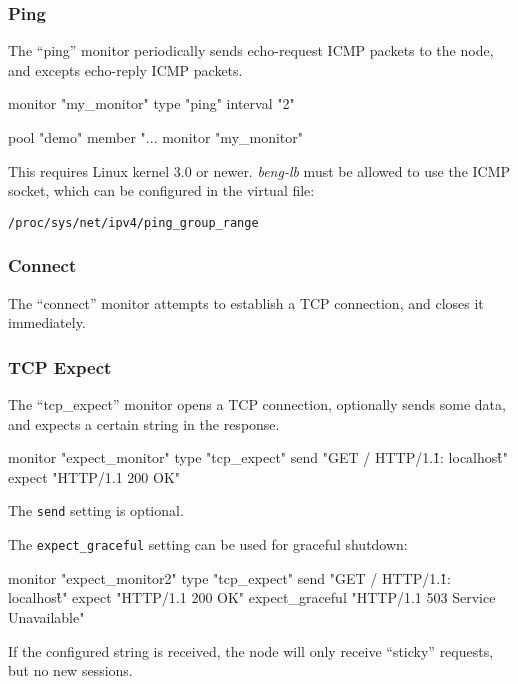 \documentclass[a4paper,12pt]{article}
\begin{document}
\subsubsection{Ping}

The ``ping'' monitor periodically sends echo-request ICMP packets to
the node, and excepts echo-reply ICMP packets.

\begin{verbatim*}
monitor "my_monitor" {
  type "ping"
  interval "2"
}

pool "demo" {
  member "...
  monitor "my_monitor"
}
\end{verbatim*}

This requires Linux kernel 3.0 or newer.  \emph{beng-lb} must be
allowed to use the ICMP socket, which can be configured in the virtual
file:

\texttt{/proc/sys/net/ipv4/ping\_group\_range}

\subsubsection{Connect}

The ``connect'' monitor attempts to establish a TCP connection, and
closes it immediately.

\subsubsection{TCP Expect}

The ``tcp\_expect'' monitor opens a TCP connection, optionally sends
some data, and expects a certain string in the response.

\begin{verbatim*}
monitor "expect_monitor" {
  type "tcp_expect"
  send "GET / HTTP/1.1\r\nHost: localhost\r\n\r\n"
  expect "HTTP/1.1 200 OK"
}
\end{verbatim*}

The \texttt{send} setting is optional.

The \verb|expect_graceful| setting can be used for graceful shutdown:

\begin{verbatim*}
monitor "expect_monitor2" {
  type "tcp_expect"
  send "GET / HTTP/1.1\r\nHost: localhost\r\n\r\n"
  expect "HTTP/1.1 200 OK"
  expect_graceful "HTTP/1.1 503 Service Unavailable"
}
\end{verbatim*}

If the configured string is received, the node will only receive
``sticky'' requests, but no new sessions.
\end{document}
